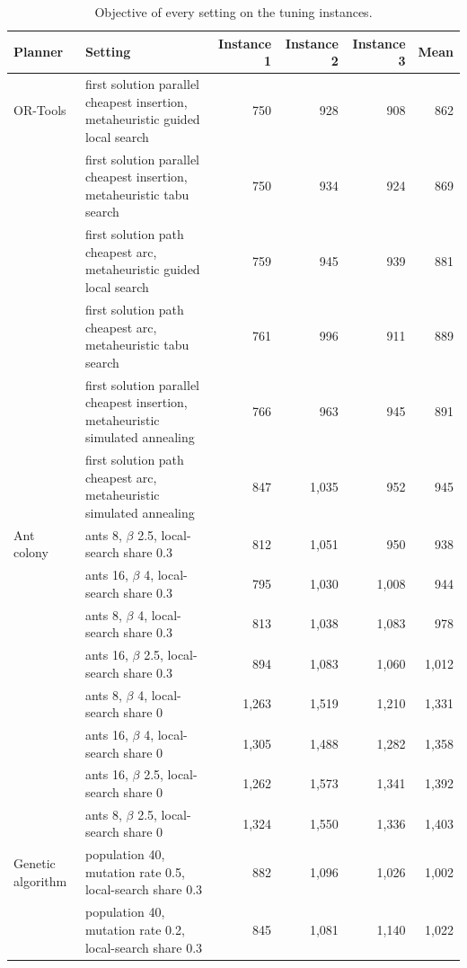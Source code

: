 \begin{table}[!htbp]
\caption{Objective of every setting on the tuning instances.}
\label{tab:tuning}
\centering
\footnotesize
\setlength{\tabcolsep}{4pt}
\begin{tabular}{l>{\raggedright\arraybackslash}p{}rrrr}
\toprule
Planner & Setting & Instance 1 & Instance 2 & Instance 3 & Mean \\
\midrule
OR-Tools & first solution parallel cheapest insertion, metaheuristic guided local search & 750 & 928 & 908 & 862 \\
 & first solution parallel cheapest insertion, metaheuristic tabu search & 750 & 934 & 924 & 869 \\
 & first solution path cheapest arc, metaheuristic guided local search & 759 & 945 & 939 & 881 \\
 & first solution path cheapest arc, metaheuristic tabu search & 761 & 996 & 911 & 889 \\
 & first solution parallel cheapest insertion, metaheuristic simulated annealing & 766 & 963 & 945 & 891 \\
 & first solution path cheapest arc, metaheuristic simulated annealing & 847 & 1{,}035 & 952 & 945 \\
\addlinespace
Ant colony & ants 8, $\beta$ 2.5, local-search share 0.3 & 812 & 1{,}051 & 950 & 938 \\
 & ants 16, $\beta$ 4, local-search share 0.3 & 795 & 1{,}030 & 1{,}008 & 944 \\
 & ants 8, $\beta$ 4, local-search share 0.3 & 813 & 1{,}038 & 1{,}083 & 978 \\
 & ants 16, $\beta$ 2.5, local-search share 0.3 & 894 & 1{,}083 & 1{,}060 & 1{,}012 \\
 & ants 8, $\beta$ 4, local-search share 0 & 1{,}263 & 1{,}519 & 1{,}210 & 1{,}331 \\
 & ants 16, $\beta$ 4, local-search share 0 & 1{,}305 & 1{,}488 & 1{,}282 & 1{,}358 \\
 & ants 16, $\beta$ 2.5, local-search share 0 & 1{,}262 & 1{,}573 & 1{,}341 & 1{,}392 \\
 & ants 8, $\beta$ 2.5, local-search share 0 & 1{,}324 & 1{,}550 & 1{,}336 & 1{,}403 \\
\addlinespace
Genetic algorithm & population 40, mutation rate 0.5, local-search share 0.3 & 882 & 1{,}096 & 1{,}026 & 1{,}002 \\
 & population 40, mutation rate 0.2, local-search share 0.3 & 845 & 1{,}081 & 1{,}140 & 1{,}022 \\

\end{tabular}
\end{table}

